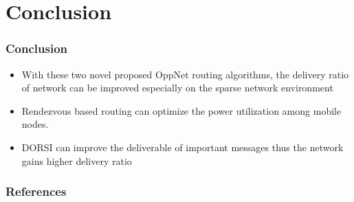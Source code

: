 \documentclass{beamer}
\begin{document}
\section{Conclusion }
\begin{frame}
	\frametitle{Conclusion }
	\begin{itemize}
		\item With these two novel proposed OppNet routing algorithms, the delivery ratio of network can be improved especially on the sparse network environment
		\item Rendezvous based routing can optimize the power utilization among mobile nodes.
		\item DORSI can improve the deliverable of important messages thus the network gains higher delivery ratio
	\end{itemize}
	
\end{frame}













































\begin{frame}[allowframebreaks]
\frametitle{References}
    \tiny{ }
    
\end{frame}
\end{document}
